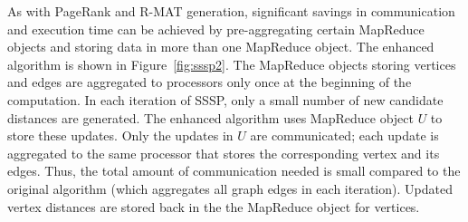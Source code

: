 As with PageRank and R-MAT generation, 
significant savings in communication and execution time
can be achieved by pre-aggregating certain MapReduce objects and 
storing data in more than one MapReduce object.  The enhanced algorithm
is shown in Figure~\ref{fig:sssp2}.  The MapReduce objects storing
vertices and edges are aggregated to processors only once at the beginning
of the computation.  In each iteration of 
SSSP, only a small number of new candidate distances are generated.
The enhanced algorithm uses MapReduce object $U$ to store these updates.
Only the updates in $U$ are communicated; each update is aggregated to the 
same processor that stores the corresponding vertex and its edges.
Thus, the total amount of communication
needed is small compared to the original algorithm (which aggregates all
graph edges in each iteration).  Updated vertex distances are stored back
in the the MapReduce object for vertices.

